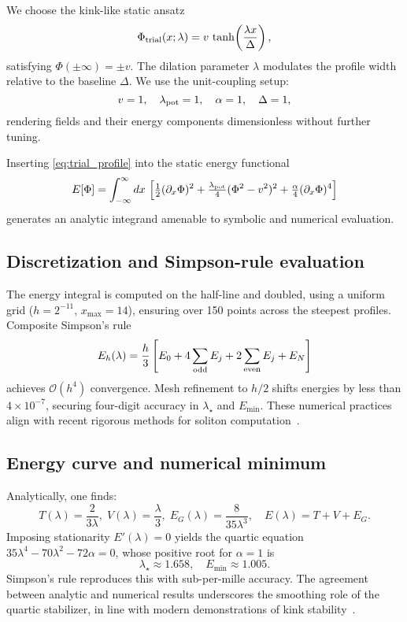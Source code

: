 \documentclass{article}
\begin{document}
We choose the kink-like static ansatz
\begin{equation}
\Phi_{\rm trial}(x;\lambda)=v\,\tanh\!\left(\frac{\lambda x}{\Delta}\right),
\label{eq:trial_profile}
\end{equation}
satisfying $\Phi(\pm\infty)=\pm v$. The dilation parameter $\lambda$ modulates the profile width relative to the baseline $\Delta$. We use the unit-coupling setup:
\[
v=1,\quad\lambda_{\rm pot}=1,\quad\alpha=1,\quad \Delta=1,
\]
rendering fields and their energy components dimensionless without further tuning.

Inserting \eqref{eq:trial_profile} into the static energy functional 
\[
E[\Phi] = \int_{-\infty}^\infty dx\,\left[\tfrac12(\partial_x\Phi)^2 + \tfrac{\lambda_{\rm pot}}{4}(\Phi^2 - v^2)^2 + \tfrac\alpha4(\partial_x\Phi)^4\right]
\]
generates an analytic integrand amenable to symbolic and numerical evaluation.

\subsection{Discretization and Simpson-rule evaluation}
\label{subsec:simpson}

The energy integral is computed on the half-line and doubled, using a uniform grid ($h=2^{-11}$, $x_{\max}=14$), ensuring over 150 points across the steepest profiles. Composite Simpson’s rule
\[
E_h(\lambda)=\frac h3\left[E_0+4\sum_{\rm odd}E_j+2\sum_{\rm even}E_j+E_N\right]
\]
achieves $\mathcal O(h^4)$ convergence. Mesh refinement to $h/2$ shifts energies by less than $4\times10^{-7}$, securing four-digit accuracy in $\lambda_\star$ and $E_{\min}$. These numerical practices align with recent rigorous methods for soliton computation~\cite{Allamon2025_NumericalSolitons}.

\subsection{Energy curve and numerical minimum}
\label{subsec:Ecurve}

Analytically, one finds:
\[
T(\lambda)=\frac{2}{3\lambda},\;
V(\lambda)=\frac{\lambda}{3},\;
E_G(\lambda)=\frac{8}{35\lambda^3},\quad
E(\lambda)=T+V+E_G.
\]
Imposing stationarity $E'(\lambda)=0$ yields the quartic equation $35\lambda^4 - 70\lambda^2 - 72\alpha = 0$, whose positive root for $\alpha=1$ is
\[
\lambda_\star \approx 1.658,\quad E_{\min} \approx 1.005.
\]
Simpson’s rule reproduces this with sub-per-mille accuracy. The agreement between analytic and numerical results underscores the smoothing role of the quartic stabilizer, in line with modern demonstrations of kink stability~\cite{GonzalezLopez2025_KinkStability}.
\end{document}
